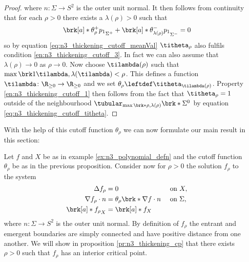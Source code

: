 \begin{proof}
  where $n\colon\Sigma\to S^2$ is the outer unit normal.
  It then follows from continuity that for each $\rho>0$ there exists a $\lambda(\rho)>0$ such that
  \begin{align*}
    \brk[a]*{\theta_\rho^+p_1}_{\Sigma^+}+\brk[a]*{\theta_{\lambda(\rho)}^-p_1}_{\Sigma^-}=0
  \end{align*}
  so by equation \eqref{eq:n3_thickening_cutoff_meanVal} $\titheta_\rho$ also fulfils condition \ref{en:n3_thickening_cutoff_3}.
  In fact we can also assume that $\lambda(\rho)\to0$ as $\rho\to0$.
  Now choose $\tilambda(\rho)$ such that $\max\brk1{\tilambda,\lambda(\tilambda)}<\rho$.
  This defines a function $\tilambda\colon \R_{\geq0}\to\R_{\geq0}$ and we set
  $\theta_\rho\leftdef \titheta_{\tilambda(\rho)}$. 
  Property \ref{en:n3_thickening_cutoff_1} then follows from the fact that $\titheta_\rho=1$ outside of the neighbourhood $\tubular_{\max\brk*{\rho,\lambda(\rho)}}\brk*{\Sigma^0}$ by
  equation \ref{eq:n3_thickening_cutoff_titheta}.
\end{proof}
With the help of this cutoff function $\theta_\rho$ we can now formulate our main result in this section:
\begin{example}
  \label{ex:n3_thickening}
  Let $f$ and $X$ be as in example \ref{ex:n3_polynomial_defn} and the cutoff function $\theta_\rho$ be as in
  the previous proposition.
  Consider now for $\rho>0$ the solution $f_\rho$ to the system
  \begin{align*}
    \Delta f_\rho&=0 &&\text{ on }X, \\
    \nabla f_\rho\cdot n&=\theta_\rho\brk*{\nabla f\cdot n} &&\text{ on }\Sigma, \\
    \brk[a]*{f_\rho}_X&=\brk[a]*{f}_X &&
  \end{align*}
  where $n\colon\Sigma\to S^2$ is the outer unit normal.
  By definition of $f_\rho$ the entrant and emergent boundaries are simply connected
  and have positive distance from one another.
  We will show in proposition \ref{pr:n3_thickening_cp} that there exists $\rho>0$ such that $f_\rho$ has an interior
  critical point.
\end{example}


